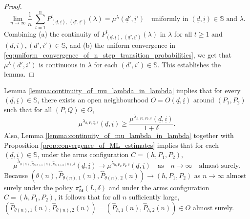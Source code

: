 \begin{proof}
\begin{equation}
	\lim\limits_{n\to \infty} \frac{1}{n}~\sum\limits_{t=1}^n P^t_{(\underline{d}, \underline{i}), ~ (\underline{d}', \underline{i}')}(\lambda) = \mu^\lambda(\underline{d}', \underline{i}')\quad \text{uniformly in }(\underline{d}, \underline{i})\in \mathbb{S}\text{ and }\lambda.
	\label{eq:uniform_convergence_of_n_step_transition_probabilities}
\end{equation}
Combining (a) the continuity of $P^t_{(\underline{d}, \underline{i}), ~ (\underline{d}', \underline{i}')}(\lambda)$ in $\lambda$ for all $t\geq 1$ and $(\underline{d}, \underline{i}), (\underline{d}', \underline{i}')\in\mathbb{S}$, and (b) the uniform convergence in \eqref{eq:uniform_convergence_of_n_step_transition_probabilities}, we get that $\mu^\lambda(\underline{d}', \underline{i}')$ is continuous in $\lambda$ for each $(\underline{d}', \underline{i}')\in \mathbb{S}$. This establishes the lemma.
\end{proof}
Lemma \ref{lemma:continuity_of_mu_lambda_in_lambda} implies that for every $(\underline{d}, \underline{i})\in \mathbb{S}$, there exists an open neighbourhood $O=O(\underline{d}, \underline{i})$
 around $(P_1, P_2)$ such that for all $(P, Q)\in O$,
\begin{equation}
	\mu^{\lambda_{h, P, Q, \delta}}(\underline{d}, \underline{i}) \geq \frac{\mu^{\lambda_{h, P_1, P_2, \delta}}(\underline{d}, \underline{i})}{1+\delta}
	 .
	\label{eq:stat_distributions_in_a_neighbourhood}
\end{equation}
Also, Lemma \ref{lemma:continuity_of_mu_lambda_in_lambda} together with Proposition \ref{prop:convergence_of_ML_estimates} implies that for each $(\underline{d}, \underline{i})\in \mathbb{S}$, under the arms configuration $C=(h, P_1, P_2)$,
\begin{equation}
	\mu^{\lambda_{\theta(n), \hat{P}_{\theta(n), 1}(n), \hat{P}_{\theta(n), 2}(n), \delta}}(\underline{d}, \underline{i}) \longrightarrow \mu^{\lambda_{h, P_1, P_2, \delta}}(\underline{d}, \underline{i})\quad \text{as}\quad n\to\infty\quad \text{almost surely}.
	\label{eq:stat_distributions_converge}
\end{equation}
Because $(\theta(n), \hat{P}_{\theta(n), 1}(n), \hat{P}_{\theta(n), 2}(n)) \longrightarrow (h, P_1, P_2)$ as $n\to \infty$ almost surely under the policy $\pi_{\textsf{ns}}^\star(L,\delta)$ and under the arms configuration $C=(h, P_1, P_2)$, it follows that for all $n$ sufficiently large, $(\hat{P}_{\theta(n), 1}(n), \hat{P}_{\theta(n), 2}(n))=(\hat{P}_{h, 1}(n), \hat{P}_{h, 2}(n))\in O$ almost surely.
